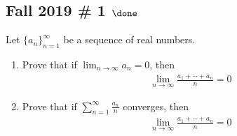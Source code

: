 \hypertarget{fall-2019-1-done}{%
\subsection{\texorpdfstring{Fall 2019 \# 1
\(\done\)}{Fall 2019 \# 1 \textbackslash done}}\label{fall-2019-1-done}}

Let \(\{a_n\}_{n=1}^\infty\) be a sequence of real numbers.

\begin{enumerate}
\def\labelenumi{\alph{enumi}.}
\item
  Prove that if \(\displaystyle\lim_{n\to \infty } a_n = 0\), then
  \begin{align*}
  \lim _{n \rightarrow \infty} \frac{a_{1}+\cdots+a_{n}}{n}=0
  \end{align*}
\item
  Prove that if \(\displaystyle\sum_{n=1}^{\infty} \frac{a_{n}}{n}\)
  converges, then
  \begin{align*}
  \lim _{n \rightarrow \infty} \frac{a_{1}+\cdots+a_{n}}{n}=0
  \end{align*}
\end{enumerate}

